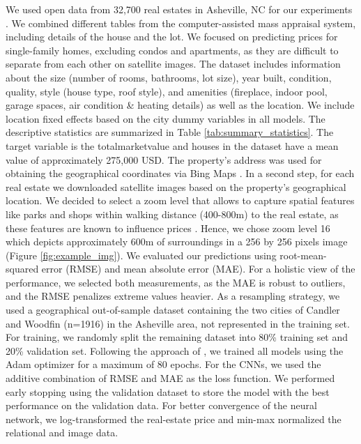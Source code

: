 \documentclass[letterpaper]{article}
\begin{document}
We used open data from 32,700 real estates in Asheville, NC for our experiments \cite{Ashville_1}. We combined different tables from the computer-assisted mass appraisal system, including details of the house and the lot. We focused on predicting prices for single-family homes, excluding condos and apartments, as they are difficult to separate from each other on satellite images. The dataset includes information about the size (number of rooms, bathrooms, lot size), year built, condition, quality, style (house type, roof style), and amenities (fireplace, indoor pool, garage spaces, air condition \& heating details) as well as the location. We include location fixed effects based on the city dummy variables in all models. The descriptive statistics are summarized in Table \ref{tab:summary_statistics}. The target variable is the totalmarketvalue and houses in the dataset have a mean value of approximately 275,000 USD. The property's address was used for obtaining the geographical coordinates via Bing Maps \cite{Bing}. In a second step, for each real estate we downloaded satellite images based on the property's geographical location. We decided to select a zoom level that allows to capture spatial features like parks and shops within walking distance (400-800m) to the real estate, as these features are known to influence prices \cite{noor2015sustainable, law2019take}. Hence, we chose zoom level 16 which depicts approximately 600m of surroundings in a 256 by 256 pixels image (Figure \ref{fig:example_img}). We evaluated our predictions using root-mean-squared error (RMSE) and mean absolute error (MAE). For a holistic view of the performance, we selected both measurements, as the MAE is robust to outliers, and the RMSE penalizes extreme values heavier. As a resampling strategy, we used a geographical out-of-sample dataset containing the two cities of Candler and Woodfin (n=1916) in the Asheville area, not represented in the training set. For training, we randomly split the remaining dataset into 80\% training set and 20\% validation set. Following the approach of \citeauthor{law2019take} \citeyearpar{law2019take}, we trained all models using the Adam optimizer for a maximum of 80 epochs. For the CNNs, we used the additive combination of RMSE and MAE as the loss function. We performed early stopping using the validation dataset to store the model with the best performance on the validation data. For better convergence of the neural network, we log-transformed the real-estate price and min-max normalized the relational and image data.
\end{document}
